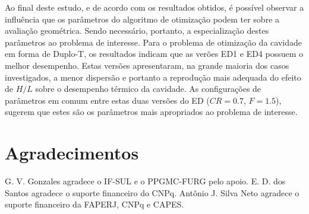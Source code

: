 \documentclass[12pt,A4,A4pt]{article}
\begin{document}
Ao final deste estudo, e de acordo com os resultados obtidos, é possível observar a influência que os parâmetros do algoritmo de otimização podem ter sobre a avaliação geométrica. Sendo necessário, portanto, a especialização destes parâmetros ao problema de interesse. Para o problema de otimização da cavidade em forma de Duplo-T, os resultados indicam que as verões ED1 e ED4 possuem o melhor desempenho. Estas versões apresentaram, na grande maioria dos casos investigados, a menor dispersão e portanto a reprodução mais adequada do efeito de $H/L$ sobre o desempenho térmico da cavidade. As configurações de parâmetros em comum entre estas duas versões do ED ($CR=0.7$, $F=1.5$), sugerem que estes são os parâmetros mais apropriados ao problema de interesse.

\section*{Agradecimentos}
\hspace{0.5cm}G. V. Gonzales agradece o IF-SUL e o  PPGMC-FURG pelo apoio. E. D. dos Santos agradece o suporte financeiro do CNPq. Antônio J. Silva Neto agradece o suporte financeiro da FAPERJ, CNPq e CAPES.

%


\end{document}

